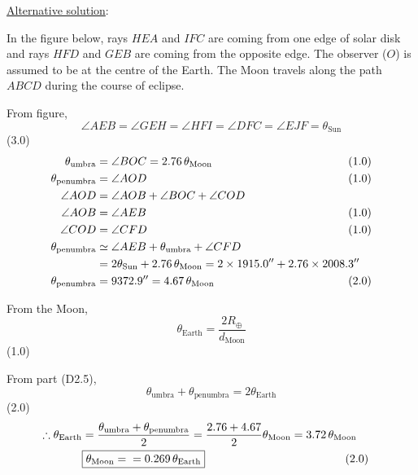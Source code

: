 \begin{description}
\underline{Alternative solution}:

In the figure below, rays $HEA$ and $IFC$ are coming from one edge of solar disk and rays
$HFD$ and $GEB$ are coming from the opposite edge. The observer ($O$) is assumed to be at
the centre of the Earth. The Moon travels along the path $ABCD$ during the course of
eclipse.

From figure,
\[
\angle AEB = \angle GEH = \angle HFI = \angle DFC = \angle EJF = \theta_{\mathrm{Sun}}
\]
\hfill(3.0)
\begin{align*}
\theta_{\mathrm{umbra}} &= \angle BOC = 2.76\,\theta_{\mathrm{Moon}}
 & &\hspace{-2em}(1.0)\\
\theta_{\mathrm{penumbra}} &= \angle AOD & &\hspace{-2em}(1.0)\\
\angle AOD &= \angle AOB + \angle BOC + \angle COD\\
\angle AOB &= \angle AEB & &\hspace{-2em}(1.0)\\
\angle COD &= \angle CFD & &\hspace{-2em}(1.0)\\
\theta_{\mathrm{penumbra}} &\simeq \angle AEB + \theta_{\mathrm{umbra}} + \angle CFD\\
 &= 2\theta_{\mathrm{Sun}} + 2.76\,\theta_{\mathrm{Moon}}
 = 2\times1915.0'' + 2.76\times2008.3''\\
\theta_{\mathrm{penumbra}} &= 9372.9'' = 4.67\,\theta_{\mathrm{Moon}}
 & &\hspace{-2em}(2.0)
\end{align*}

\item[(D2.6)]
From the Moon,
\[
\theta_{\mathrm{Earth}} = \frac{2R_\oplus}{d_{\mathrm{Moon}}}
\]
\hfill(1.0)

From part (D2.5),
\[
\theta_{\mathrm{umbra}} + \theta_{\mathrm{penumbra}} = 2\theta_{\mathrm{Earth}}
\]
\hfill(2.0)
\begin{align*}
\therefore \theta_{\mathrm{Earth}}
 &= \frac{\theta_{\mathrm{umbra}} + \theta_{\mathrm{penumbra}}}{2}
 = \frac{2.76 + 4.67}{2}\theta_{\mathrm{Moon}} = 3.72\,\theta_{\mathrm{Moon}}\\
&\fbox{$\theta_{\mathrm{Moon}} = {} = 0.269\,\theta_{\mathrm{Earth}}$}
 & &\hspace{-2em}(2.0)
\end{align*}


\end{description}

